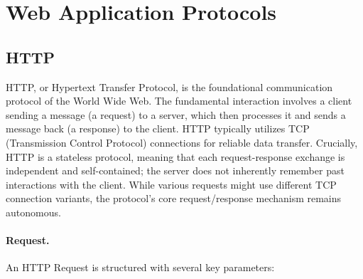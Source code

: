 \section{Web Application Protocols}
\subsection{HTTP}
HTTP, or Hypertext Transfer Protocol, is the foundational communication protocol of the World Wide Web. The fundamental interaction involves a client sending a message (a request) to a server, which then processes it and sends a message back (a response) to the client. HTTP typically utilizes TCP (Transmission Control Protocol) connections for reliable data transfer. Crucially, HTTP is a stateless protocol, meaning that each request-response exchange is independent and self-contained; the server does not inherently remember past interactions with the client. While various requests might use different TCP connection variants, the protocol's core request/response mechanism remains autonomous.

\paragraph{Request.} An HTTP Request is structured with several key parameters:

